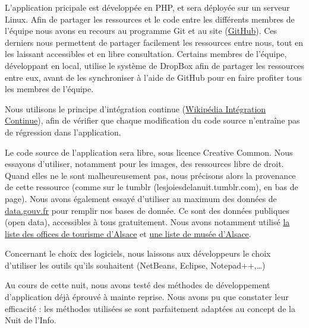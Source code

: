 \documentclass[12pt, a4paper]{article}
\newcommand{\espace}{\vspace{.8cm}}
\begin{document}
L'application pricipale est développée en PHP, et sera déployée sur un serveur Linux. Afin de partager les ressources et le code entre les différents membres de l'équipe nous avons eu recours au programme Git et au site (\href{https://github.com/}{GitHub}). Ces derniers nous permettent de partager facilement les ressources entre nous, tout en les laissant accessibles et en libre consultation.
Certains membres de l'équipe, développant en local, utilise le système de DropBox afin de partager les ressources entre eux, avant de les synchroniser à l'aide de GitHub pour en faire profiter tous les membres de l'équipe.

Nous utilisons le principe d'intégration continue (\href{http://fr.wikipedia.org/wiki/Int%C3%A9gration_continue}{Wikipédia Intégration Continue}), afin de vérifier que chaque modification du code source n'entraîne pas de régression dans l'application.

Le code source de l'application sera libre, sous licence Creative Common. Nous essayons d'utiliser, notamment pour les images, des ressources libre de droit. Quand elles ne le sont malheureusement pas, nous précisons alors la provenance de cette ressource (comme sur le tumblr (lesjoiesdelanuit.tumblr.com), en bas de page).
Nous avons également essayé d'utiliser au maximum des données de \href{http://www.data.gouv.fr/}{data.gouv.fr} pour remplir nos bases de donnée. Ce sont des données publiques (open data), accessibles à tous gratuitement. Nous avons notamment utilisé \href{http://www.data.gouv.fr/donnees/view/Liste-des-offices-de-tourisme-d%27Alsace-564156}{la liste des offices de tourisme d'Alsace} et \href{http://www.data.gouv.fr/donnees/view/Fr%C3%A9quentation-2006-2010-des-mus%C3%A9es-de-France---Alsace-30382306?xtmc=alsace+mus%C3%A9e&xtcr=1}{une liste de musée d'Alsace}.

Concernant le choix des logiciels, nous laissons aux développeurs le choix d'utiliser les outils qu'ils souhaitent (NetBeans, Eclipse, Notepad++,\ldots{})

Au cours de cette nuit, nous avons testé des méthodes de développement d'application déjà éprouvé à mainte reprise. Nous avons pu que constater leur efficacité : les méthodes utilisées se sont parfaitement adaptées au concept de la Nuit de l'Info.

\espace{}
\end{document}
